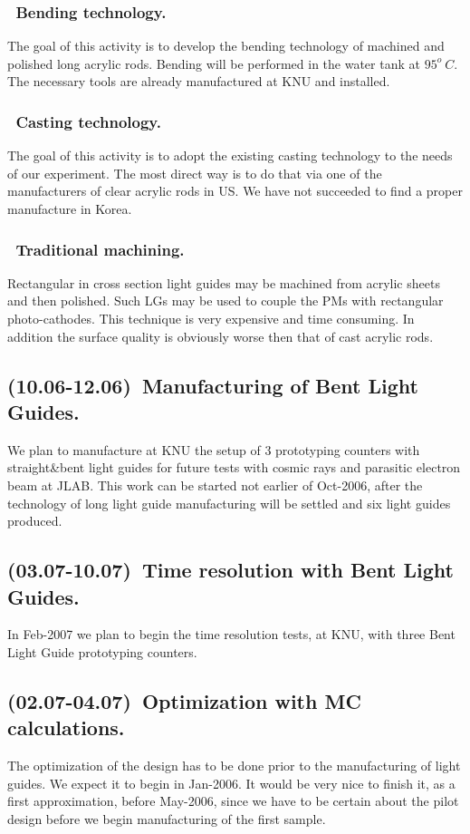 \subsubsection{~Bending technology.} 
The goal of this activity is to develop the bending  technology of 
machined and polished long acrylic rods. 
Bending will be performed in the water tank at  $95^o~C.$
The necessary tools are already manufactured at KNU and installed.
\subsubsection{~Casting  technology.} 
\label{casting}
The goal of this activity is to adopt  the existing  casting technology
to the needs of our experiment. The most direct way is to do that via 
 one of the manufacturers of clear acrylic rods in US.
We have not succeeded to find a proper manufacture in Korea.
\subsubsection{~Traditional machining.}
Rectangular in cross section light guides may be machined from acrylic 
 sheets and then polished. Such LGs may be used to couple the   PMs with
 rectangular photo-cathodes. This technique is very expensive and 
time consuming. In addition  the surface quality is obviously 
worse then that of cast acrylic rods.


\subsection{(10.06-12.06)~Manufacturing of  Bent Light Guides.}
We plan to manufacture at KNU the setup
 of 3 prototyping counters with straight\&bent light guides
for future tests with cosmic rays and parasitic electron beam at JLAB.
 This work can be started not earlier of   Oct-2006, after the technology
of long light guide manufacturing will be settled and six light guides produced.


\subsection{(03.07-10.07)~Time resolution with Bent Light Guides.}
In Feb-2007  we plan to begin  the time  resolution tests, at KNU,
with three  Bent Light Guide prototyping counters.

\subsection{(02.07-04.07)~Optimization  with MC calculations.}
The optimization of the design has to be done prior to the manufacturing of 
light guides. We expect it to begin in Jan-2006. It would be very nice to finish
it, as a first approximation, before May-2006, 
since we have to be certain about the pilot design
before we begin manufacturing of the first sample. 

